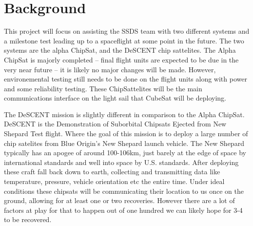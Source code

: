 \section{Background}
\par This project will focus on assisting the SSDS team with two different systems and a milestone test leading up to a spaceflight at some point in the future. The two systems are the alpha ChipSat, and the DeSCENT chip sattelites. The Alpha ChipSat is majorly completed -- final flight units are expected to be due in the very near future -- it is likely no major changes will be made. However, environemental testing still needs to be done on the flight units along with power and some reliability testing. These ChipSattelites will be the main communications interface on the light sail that CubeSat will be deploying. 

The DeSCENT mission is slightly different in comparison to the Alpha ChipSat. DeSCENT is the Demonstration of Suborbital Chipsats Ejected from New Shepard Test flight. Where the goal of this mission is to deploy a large number of chip satelites from Blue Origin's New Shepard launch vehicle. The New Shepard typically has an apogee of around 100-106km, just barely at the edge of space by international standards and well into space by U.S. standards.
After deploying these craft fall back down to earth, 
collecting and transmitting data like temperature, pressure, vehicle orientation etc the entire time.
Under ideal conditions these chipsats will be communicating their location to us once on the ground, allowing for at least one or two recoveries. However there are a lot of factors at play for that to happen out of one hundred we can likely hope for 3-4 to be recovered. 